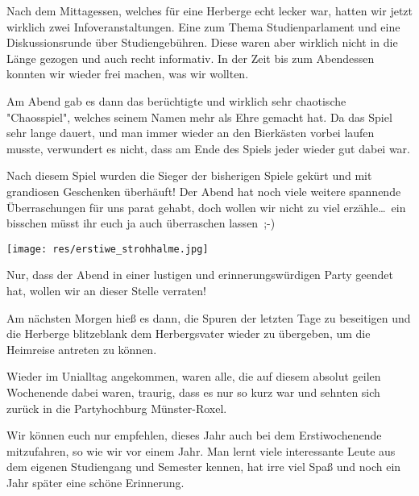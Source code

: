 \begin{multicols}{2}
\begin{center}
\end{center}

Nach dem Mittagessen, welches für eine Herberge echt lecker war, hatten wir jetzt wirklich zwei Infoveranstaltungen. Eine zum Thema Studienparlament und eine Diskussionsrunde über Studiengebühren. Diese waren aber wirklich nicht in die Länge gezogen und auch recht informativ. In der Zeit bis zum Abendessen konnten wir wieder frei machen, was wir wollten.


Am Abend gab es dann das berüchtigte und wirklich sehr chaotische "Chaosspiel", welches seinem Namen mehr als Ehre gemacht hat. Da das Spiel sehr lange dauert, und man immer wieder an den Bierkästen vorbei laufen musste, verwundert es nicht, dass am Ende des Spiels jeder wieder gut dabei war.

Nach diesem Spiel wurden die Sieger der bisherigen Spiele gekürt und mit grandiosen Geschenken überhäuft! Der Abend hat noch viele weitere spannende Überraschungen für uns parat gehabt, doch wollen wir nicht zu viel erzähle\dots\ ein bisschen müsst ihr euch ja auch überraschen lassen~;-)

\texttt{[image: res/erstiwe\_strohhalme.jpg]}

Nur, dass der Abend in einer lustigen und erinnerungswürdigen Party geendet hat, wollen wir an dieser Stelle verraten!

Am nächsten Morgen hieß es dann, die Spuren der letzten Tage zu beseitigen und die Herberge blitzeblank dem Herbergsvater wieder zu übergeben, um die Heimreise antreten zu können.

Wieder im Unialltag angekommen, waren alle, die auf diesem absolut geilen Wochenende dabei waren, traurig, dass es nur so kurz war und sehnten sich zurück in die Partyhochburg Münster-Roxel.

Wir können euch nur empfehlen, dieses Jahr auch bei dem Erstiwochenende mitzufahren, so wie wir vor einem Jahr. Man lernt viele interessante Leute aus dem eigenen Studiengang und Semester kennen, hat irre viel Spaß und noch ein Jahr später eine schöne Erinnerung.

\begin{center}
\large{}
\end{center}

\end{multicols}

